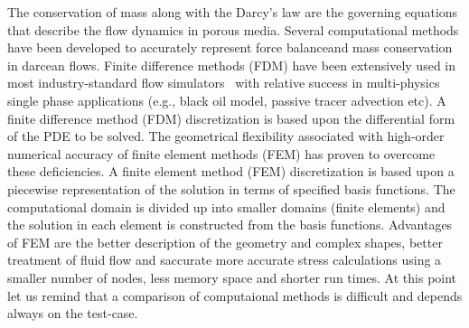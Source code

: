 \documentclass[preprint,authoryear,12pt]{elsarticle}
\begin{document}


\medskip 
The conservation of mass along with the Darcy's law are the governing equations that describe the flow dynamics in porous media. Several computational methods have been developed to accurately represent force balanceand mass conservation in darcean flows.
Finite difference methods (FDM) have been extensively used in most industry-standard flow simulators~\citep{aziz_1986, chen_2005, chang_1990} with relative success in multi-physics single phase applications (e.g., black oil model, passive tracer advection etc). A finite difference method (FDM) discretization is based upon the differential form of the PDE to be solved. 
The geometrical flexibility associated with high-order numerical accuracy of finite element methods (FEM) has proven to overcome these deficiencies. A finite element method (FEM) discretization is based upon a piecewise representation of the solution in terms of specified basis functions. The computational domain is divided up into smaller domains (finite elements) and the solution in each element is constructed from the basis functions. Advantages of FEM are the better description of the geometry and complex shapes, better treatment of fluid flow and saccurate more accurate stress calculations using a smaller number of nodes, less memory space and shorter run times. At this point let us remind that a comparison of computaional methods is difficult and depends always on the test-case.
\end{document}
